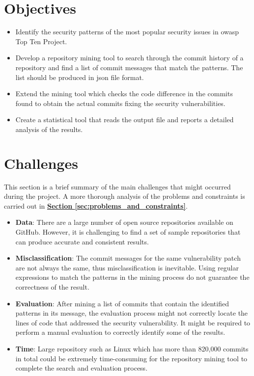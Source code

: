 \documentclass[12pt, a4paper]{report}
\begin{document}
\section{Objectives} \label{sec:objectives}
\begin{itemize}
  \item Identify the security patterns of the most popular security issues in \acrfull{owasp} Top
        Ten Project.
  \item Develop a repository mining tool to search through the commit history of a repository and
        find a list of commit messages that match the patterns. The list should be produced in
        \acrfull{json} file format.
  \item Extend the mining tool which checks the code difference in the commits found to obtain the
        actual commits fixing the security vulnerabilities.
  \item Create a statistical tool that reads the output file and reports a detailed analysis of the
        results.
\end{itemize}

\section{Challenges} \label{sec:challenges}
This section is a brief summary of the main challenges that might occurred during the project. A
more thorough analysis of the problems and constraints is carried out in
\hyperref[sec:problems_and_constraints]{\textbf{Section \ref*{sec:problems_and_constraints}}}.

\begin{itemize}
  \item \textbf{Data}: There are a large number of open source repositories available on GitHub.
        However, it is challenging to find a set of sample repositories that can produce accurate and
        consistent results.
  \item \textbf{Misclassification}: The commit messages for the same vulnerability patch are not
        always the same, thus misclassification is inevitable. Using regular expressions to match the
        patterns in the mining process do not guarantee the correctness of the result.
  \item \textbf{Evaluation}: After mining a list of commits that contain the identified patterns in
        its message, the evaluation process might not correctly locate the lines of code that addressed
        the security vulnerability. It might be required to perform a manual evaluation to correctly
        identify some of the results.
  \item \textbf{Time}: Large repository such as Linux which has more than 820,000 commits in total
        \cite{linux_repo} could be extremely time-consuming for the repository mining tool to complete the
        search and evaluation process.
\end{itemize}
\end{document}
